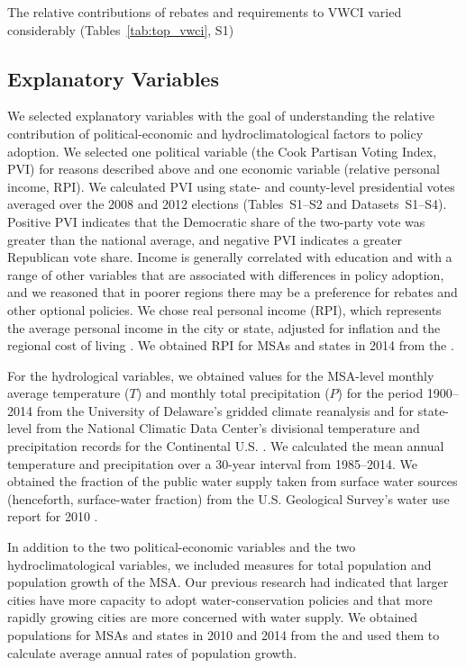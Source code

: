 \documentclass[draft,linenumbers]{agujournal}\usepackage{knitr}
\begin{document}
The relative contributions of rebates and requirements to VWCI varied
considerably (Tables~\ref{tab:top_vwci}, S1)

\subsection{Explanatory Variables}
We selected explanatory variables with the goal of understanding the
relative contribution of political-economic and hydroclimatological factors
to policy adoption.
We selected one political variable (the Cook Partisan Voting Index, PVI) for reasons
described above and one economic variable (relative personal income, RPI).
We calculated PVI using state- and county-level presidential votes averaged over the
2008 and 2012 elections \citep{cook:pvi:2013,cq:elections:2016}
(Tables~S1--S2 and Datasets~S1--S4).
Positive PVI indicates that the Democratic share of the two-party vote was greater
than the national average, and negative PVI indicates a greater Republican vote share.
Income is generally correlated with education and with a range of other variables that
are associated with differences in policy adoption, and we reasoned that in poorer
regions there may be a preference for rebates and other optional policies.
We chose real personal income (RPI), which represents the average personal income in the city
or state, adjusted for inflation and the regional cost of living
\citep{bea:rpp.methodology:2016}.
We obtained RPI for MSAs and states in 2014 from the
\citet{bea:rpi:2016}.

For the hydrological variables, we
obtained values for the MSA-level monthly average temperature ($T$) and monthly
total precipitation ($P$) for the period 1900--2014 from the University of Delaware's
gridded climate reanalysis
\citep{matsuura:gridded.temp:2015,matsuura:gridded.precip:2015}
and for state-level from the National Climatic Data Center's divisional temperature
and precipitation records for the Continental U.S.
\citep{vose:nclimdiv:2014}.
We calculated the mean annual temperature and precipitation over a
30-year interval from 1985--2014.
We obtained the fraction of the public water supply taken from surface water sources
(henceforth, surface-water fraction) from the U.S. Geological
Survey's water use report for 2010 \citep{maupin:water.use:2014}.

In addition to the two political-economic variables and the two hydroclimatological variables,
we included measures for total population and population growth of the MSA. Our previous research had
indicated that larger cities have more capacity to adopt water-conservation policies and that more
rapidly growing cities are more concerned with water supply. We obtained populations for MSAs and states
in 2010 and 2014 from the \citet{census:population:2015} and used them to calculate average annual rates
of population growth.
\end{document}
